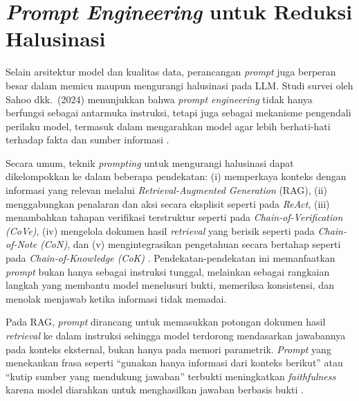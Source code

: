 


\section{\textit{Prompt Engineering} untuk Reduksi Halusinasi}
\label{sec:prompt-reduce-halusinasi}

Selain arsitektur model dan kualitas data, perancangan \textit{prompt} juga berperan besar dalam memicu maupun mengurangi halusinasi pada LLM. Studi survei oleh Sahoo dkk.\ (2024) menunjukkan bahwa \textit{prompt engineering} tidak hanya berfungsi sebagai antarmuka instruksi, tetapi juga sebagai mekanisme pengendali perilaku model, termasuk dalam mengarahkan model agar lebih berhati-hati terhadap fakta dan sumber informasi \parencite{sahoo2024prompt}.

Secara umum, teknik \textit{prompting} untuk mengurangi halusinasi dapat dikelompokkan ke dalam beberapa pendekatan: (i) memperkaya konteks dengan informasi yang relevan melalui \textit{Retrieval-Augmented Generation} (RAG), (ii) menggabungkan penalaran dan aksi secara eksplisit seperti pada \textit{ReAct}, (iii) menambahkan tahapan verifikasi terstruktur seperti pada \textit{Chain-of-Verification (CoVe)}, (iv) mengelola dokumen hasil \textit{retrieval} yang berisik seperti pada \textit{Chain-of-Note (CoN)}, dan (v) mengintegrasikan pengetahuan secara bertahap seperti pada \textit{Chain-of-Knowledge (CoK)} \parencite{sahoo2024prompt}. Pendekatan-pendekatan ini memanfaatkan \textit{prompt} bukan hanya sebagai instruksi tunggal, melainkan sebagai rangkaian langkah yang membantu model menelusuri bukti, memeriksa konsistensi, dan menolak menjawab ketika informasi tidak memadai.

Pada RAG, \textit{prompt} dirancang untuk memasukkan potongan dokumen hasil \textit{retrieval} ke dalam instruksi sehingga model terdorong mendasarkan jawabannya pada konteks eksternal, bukan hanya pada memori parametrik. \textit{Prompt} yang menekankan frasa seperti ``gunakan hanya informasi dari konteks berikut'' atau ``kutip sumber yang mendukung jawaban'' terbukti meningkatkan \textit{faithfulness} karena model diarahkan untuk menghasilkan jawaban berbasis bukti \parencite{lewis2020retrieval,ragtruth2025}.

